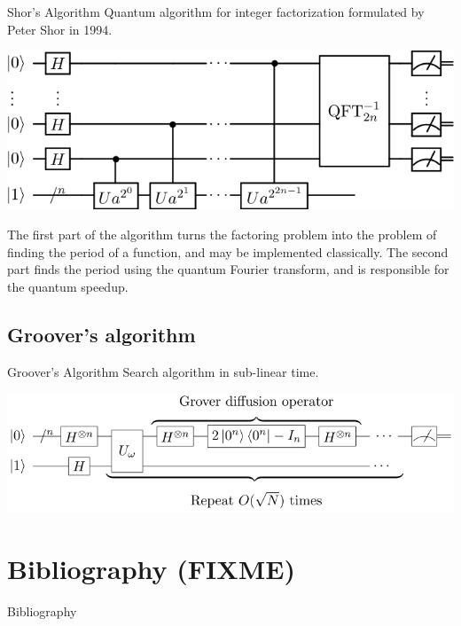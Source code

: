 \documentclass[svgnames,smaller,aspectratio=169]{beamer}
\begin{document}
\begin{frame}[fragile]{Shor's Algorithm}
  Quantum algorithm for integer factorization formulated by Peter Shor in 1994.

  \begin{center}
    \includegraphics[height=.3\textheight]{shor}
  \end{center}
  The first part of the algorithm turns the factoring problem into the problem of finding the period of a function, and
  may be implemented classically. The second part finds the period using the quantum Fourier transform, and is
  responsible for the quantum speedup.

\end{frame}


\subsection{Groover's algorithm}
\begin{frame}[fragile]{Groover's Algorithm}
  Search algorithm in sub-linear time.
  \begin{center}
    \includegraphics[height=.3\textheight]{grover}
  \end{center}
\end{frame}

\section*{Bibliography (FIXME)}
\begin{frame}[allowframebreaks]{Bibliography}
\printbibliography
\end{frame}
\end{document}

